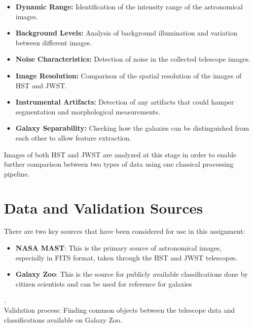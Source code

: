 \documentclass[11pt]{article}
\begin{document}
\begin{itemize}
    \item \textbf{Dynamic Range:} Identification of the intensity range of the astronomical images.
    \item \textbf{Background Levels:} Analysis of background illumination and variation between different images.
    \item \textbf{Noise Characteristics:} Detection of noise in the collected telescope images.
    \item \textbf{Image Resolution:} Comparison of the spatial resolution of the images of HST and JWST.
    \item \textbf{Instrumental Artifacts:} Detection of any artifacts that could hamper segmentation and morphological measurements.
    \item \textbf{Galaxy Separability:} Checking how the galaxies can be distinguished from each other to allow feature extraction.
\end{itemize}

Images of both HST and JWST are analyzed at this stage in order to enable further comparison between two types of data using one classical processing pipeline.


\section{Data and Validation Sources}

There are two key sources that have been considered for use in this assignment:
\begin{itemize}
    \item \textbf{NASA MAST}: This is the primary source of astronomical images, especially in FITS format, taken through the HST and JWST telescopes.
    \item \textbf{Galaxy Zoo}: This is the source for publicly available classifications done by citizen scientists and can be used for reference for galaxies

\end{itemize}.
\\
Validation process: Finding common objects between the telescope data and classifications available on Galaxy Zoo.
\end{document}
